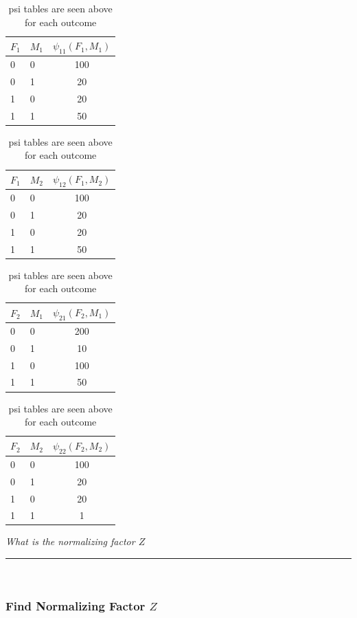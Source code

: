 \documentclass{article}
\begin{document}
\begin{table}[h]
\centering
\begin{tabular}{llc}
\toprule
$F_1$ & $M_1$ & $\psi_{11}(F_1,M_1)$ \\
\midrule
0 & 0 & 100 \\
0 & 1 & 20 \\
1 & 0 & 20 \\
1 & 1 & 50 \\
\bottomrule
\end{tabular}
\quad
\begin{tabular}{llc}
\toprule
$F_1$ & $M_2$ & $\psi_{12}(F_1,M_2)$ \\
\midrule
0 & 0 & 100 \\
0 & 1 & 20 \\
1 & 0 & 20 \\
1 & 1 & 50 \\
\bottomrule
\end{tabular}

\vspace{0.25em}

\begin{tabular}{llc}
\toprule
$F_2$ & $M_1$ & $\psi_{21}(F_2,M_1)$ \\
\midrule
0 & 0 & 200 \\
0 & 1 & 10 \\
1 & 0 & 100 \\
1 & 1 & 50 \\
\bottomrule
\end{tabular}
\quad
\begin{tabular}{llc}
\toprule
$F_2$ & $M_2$ & $\psi_{22}(F_2,M_2)$ \\
\midrule
0 & 0 & 100 \\
0 & 1 & 20 \\
1 & 0 & 20 \\
1 & 1 & 1 \\
\bottomrule
\end{tabular}
\vspace{1em}
\caption[Psi Tables]{psi tables are seen above for each outcome}
\label{tab:psi_table}
\end{table}

\newpage

\begin{flushleft}
    \textit{What is the normalizing factor $Z$}
\end{flushleft}

\noindent\rule{\textwidth}{0.4pt}\\

\subsubsection*{Find Normalizing Factor $Z$}
\end{document}

